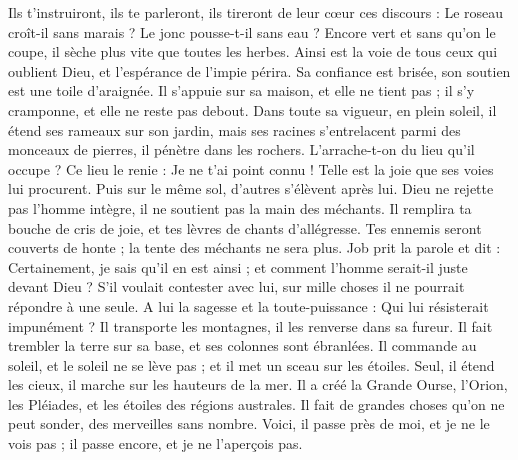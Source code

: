 \begin{multicols}{2}
Ils t'instruiront, ils te parleront, ils tireront de leur cœur ces discours :
Le roseau croît-il sans marais ? Le jonc pousse-t-il sans eau ?
Encore vert et sans qu'on le coupe, il sèche plus vite que toutes les herbes.
Ainsi est la voie de tous ceux qui oublient Dieu, et l'espérance de l'impie périra.
Sa confiance est brisée, son soutien est une toile d'araignée.
Il s'appuie sur sa maison, et elle ne tient pas ; il s'y cramponne, et elle ne reste pas debout.
Dans toute sa vigueur, en plein soleil, il étend ses rameaux sur son jardin,
mais ses racines s'entrelacent parmi des monceaux de pierres, il pénètre dans les rochers.
L'arrache-t-on du lieu qu'il occupe ? Ce lieu le renie : Je ne t'ai point connu !
Telle est la joie que ses voies lui procurent. Puis sur le même sol, d'autres s'élèvent après lui.
Dieu ne rejette pas l'homme intègre, il ne soutient pas la main des méchants.
Il remplira ta bouche de cris de joie, et tes lèvres de chants d'allégresse.
Tes ennemis seront couverts de honte ; la tente des méchants ne sera plus.
\VerseOne{}Job prit la parole et dit :
Certainement, je sais qu'il en est ainsi ; et comment l'homme serait-il juste devant Dieu ?
S'il voulait contester avec lui, sur mille choses il ne pourrait répondre à une seule.
A lui la sagesse et la toute-puissance : Qui lui résisterait impunément ?
Il transporte les montagnes, il les renverse dans sa fureur.
Il fait trembler la terre sur sa base, et ses colonnes sont ébranlées.
Il commande au soleil, et le soleil ne se lève pas ; et il met un sceau sur les étoiles.
Seul, il étend les cieux, il marche sur les hauteurs de la mer.
Il a créé la Grande Ourse, l'Orion, les Pléiades, et les étoiles des régions australes.
Il fait de grandes choses qu'on ne peut sonder, des merveilles sans nombre.
Voici, il passe près de moi, et je ne le vois pas ; il passe encore, et je ne l'aperçois pas.

\end{multicols}
